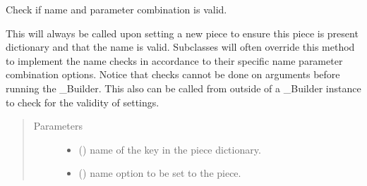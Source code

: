 \documentclass[letterpaper,10pt,english]{sphinxmanual}
\begin{document}
\begin{fulllineitems}

\begin{fulllineitems}
\label{\detokenize{dalio.pipe:dalio.pipe.builders.CovShrink.check_name}}
Check if name and parameter combination is valid.

This will always be called upon setting a new piece to ensure this
piece is present dictionary and that the name is valid. Subclasses
will often override this method to implement the name checks in
accordance to their specific name parameter combination options.
Notice that checks cannot be done on arguments before running the
\_Builder. This also can be called from outside of a \_Builder instance
to check for the validity of settings.
\begin{quote}\begin{description}
\item[{Parameters}] \leavevmode\begin{itemize}
\item {} 
 () \textendash{} name of the key in the piece dictionary.

\item {} 
 () \textendash{} name option to be set to the piece.

\end{itemize}

\end{description}\end{quote}

\end{fulllineitems}


\begin{fulllineitems}
\end{fulllineitems}



\end{fulllineitems}
\end{document}
